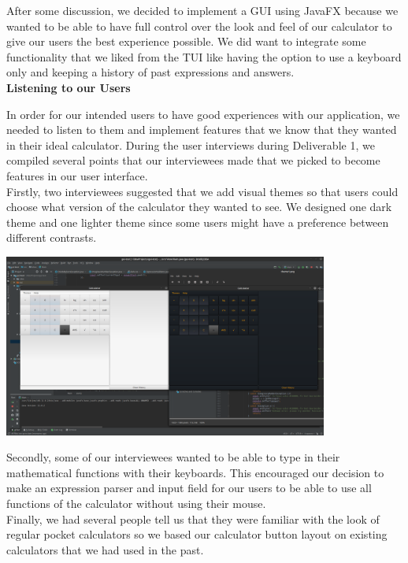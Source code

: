 \documentclass[a4paper, 12pt]{article}
\begin{document}
After some discussion, we decided to implement a GUI using JavaFX because we wanted to be able to have full control over the look and feel of our calculator to give our users the best experience possible. We did want to integrate some functionality that we liked from the TUI like having the option to use a keyboard only and keeping a history of past expressions and answers.
\\

\textbf{Listening to our Users}

In order for our intended users to have good experiences with our application, we needed to listen to them and implement features that we know that they wanted in their ideal calculator. 
During the user interviews during Deliverable 1, we compiled several points that our interviewees made that we picked to become features in our user interface. 
\\

Firstly, two interviewees suggested that we add visual themes so that users could choose what version of the calculator they wanted to see. We designed one dark theme and one lighter theme since some users might have a preference between different contrasts. 

\vspace{5mm}

\includegraphics[width=0.80\textwidth]{themes.png}

\vspace{5mm}

Secondly, some of our interviewees wanted to be able to type in their mathematical functions with their keyboards. This encouraged our decision to make an expression parser and input field for our users to be able to use all functions of the calculator without using their mouse. 
\\

Finally, we had several people tell us that they were familiar with the look of regular pocket calculators so we based our calculator button layout on existing calculators that we had used in the past.
\end{document}
